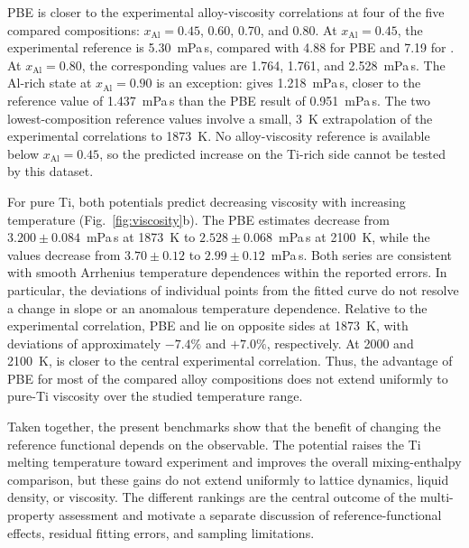 PBE is closer to the experimental alloy-viscosity correlations at four of the five compared compositions: $x_{\mathrm{Al}}=0.45$, 0.60, 0.70, and 0.80.
At $x_{\mathrm{Al}}=0.45$, the experimental reference is 5.30~mPa\,s, compared with 4.88 for PBE and 7.19 for \rscan{}.
At $x_{\mathrm{Al}}=0.80$, the corresponding values are 1.764, 1.761, and 2.528~mPa\,s.
The Al-rich state at $x_{\mathrm{Al}}=0.90$ is an exception: \rscan{} gives 1.218~mPa\,s, closer to the reference value of 1.437~mPa\,s than the PBE result of 0.951~mPa\,s.
The two lowest-composition reference values involve a small, 3~K extrapolation of the experimental correlations to 1873~K.
No alloy-viscosity reference is available below $x_{\mathrm{Al}}=0.45$, so the predicted increase on the Ti-rich side cannot be tested by this dataset.

For pure Ti, both potentials predict decreasing viscosity with increasing temperature (Fig.~\ref{fig:viscosity}b).
The PBE estimates decrease from $3.200\pm0.084$~mPa\,s at 1873~K to $2.528\pm0.068$~mPa\,s at 2100~K, while the \rscan{} values decrease from $3.70\pm0.12$ to $2.99\pm0.12$~mPa\,s.
Both series are consistent with smooth Arrhenius temperature dependences within the reported errors.
In particular, the deviations of individual \rscan{} points from the fitted curve do not resolve a change in slope or an anomalous temperature dependence.
Relative to the experimental correlation, PBE and \rscan{} lie on opposite sides at 1873~K, with deviations of approximately $-7.4\%$ and $+7.0\%$, respectively.
At 2000 and 2100~K, \rscan{} is closer to the central experimental correlation.
Thus, the advantage of PBE for most of the compared alloy compositions does not extend uniformly to pure-Ti viscosity over the studied temperature range.

Taken together, the present benchmarks show that the benefit of changing the reference functional depends on the observable.
The \rscan{} potential raises the Ti melting temperature toward experiment and improves the overall mixing-enthalpy comparison, but these gains do not extend uniformly to lattice dynamics, liquid density, or viscosity.
The different rankings are the central outcome of the multi-property assessment and motivate a separate discussion of reference-functional effects, residual fitting errors, and sampling limitations.
